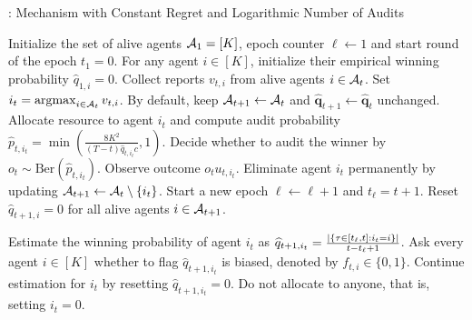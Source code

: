 

\begin{algorithm}[!t]
\caption{\mechname: Mechanism with Constant Regret and Logarithmic Number of Audits}
\label{alg:mechanism}
\begin{algorithmic}[1]
\State Initialize the set of alive agents $\mathcal{A}_1=[K]$, epoch counter $\ell\gets 1$ and start round of the epoch $t_1=0$. For any agent $i\in [K]$, initialize their empirical winning probability $\hat q_{1,i}=0$. 
\State Collect reports $v_{t,i}$ from alive agents $i\in \mathcal{A}_t$. Set $i_t=\argmax_{i\in \mA_t} v_{t,i}$. 
\State By default, keep $\mathcal{A}_{t+1}\gets \mathcal{A}_t$ and $\hat{\bm q}_{t+1}\gets \hat{\bm q}_t$ unchanged.
\State Allocate resource to agent $i_t$ and compute audit probability $\hat p_{t,i_t}=\min(\frac{8K^2}{(T-t)\hat q_{t,i_t} c},1)$. 
\State Decide whether to audit the winner by $o_t\sim \text{Ber}(\hat p_{t,i_t})$. Observe outcome $o_tu_{t,i_t}$. 
  
\State Eliminate agent $i_t$ permanently by updating $\mathcal{A}_{t+1}\gets \mathcal{A}_t\setminus \{i_t\}$. Start a new epoch $\ell\gets \ell+1$ and $t_{\ell}=t+1$. Reset $\hat q_{t+1,i}=0$ for all alive agents $i\in\mathcal{A}_{t+1}$.
\EndIf

  
\State Estimate the winning probability of agent $i_t$ as $\widehat q_{t+1,i_t}=\frac{\left|\left\{ \tau\in [t_\ell,t]:i_t=i \right\}\right|}{t-t_\ell+1}$. 
\State Ask every agent $i\in [K]$ whether to flag $\hat q_{t+1,i_t}$ is biased, denoted by $f_{t,i}\in \{0,1\}$. 
 
\State Continue estimation for $i_t$ by resetting $\hat q_{t+1,i_t}=0$. 
\EndIf
\EndIf
\Else {}
\State Do not allocate to anyone, that is, setting $i_t=0$.
\EndIf
\EndFor
\end{algorithmic}
\end{algorithm}

